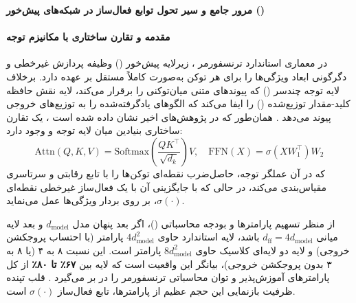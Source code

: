 \item \textbf{مرور جامع و سیر تحول توابع فعال‌ساز در شبکه‌های پیش‌خور ()}

\paragraph*{مقدمه و تقارن ساختاری  با مکانیزم توجه}
در معماری استاندارد ترنسفورمر \cite{vaswani2017attention}، زیرلایه پیش‌خور () وظیفه پردازش غیرخطی و دگرگونی ابعاد ویژگی‌ها را برای هر توکن به‌صورت کاملاً مستقل بر عهده دارد. برخلاف لایه توجه چندسر () که پیوندهای متنی میان‌توکنی را برقرار می‌کند، لایه  نقش حافظه کلید-مقدار توزیع‌شده () را ایفا می‌کند که الگوهای یادگرفته‌شده را به توزیع‌های خروجی پیوند می‌دهد \cite{geva2020transformer}. همان‌طور که در پژوهش‌های اخیر نشان داده شده است \cite{gerber2025attention, zhang2025flashmhf}، یک تقارن ساختاری بنیادین میان لایه توجه و  وجود دارد:
\begin{equation}
    \text{Attn}(Q, K, V) = \text{Softmax}\left(\frac{QK^\top}{\sqrt{d_k}}\right)V, \quad \text{FFN}(X) = \sigma(X W_1^\top) W_2
\end{equation}
که در آن عملگر توجه، حاصل‌ضرب نقطه‌ای توکن‌ها را با تابع رقابتی و سرتاسری  مقیاس‌بندی می‌کند، در حالی که  با جایگزینی آن با یک فعال‌ساز غیرخطی نقطه‌ای $\sigma(\cdot)$، بر روی بردار ویژگی‌ها عمل می‌نماید. 

از منظر تسهیم پارامترها و بودجه محاسباتی ()، اگر بعد پنهان مدل $d_{\text{model}}$ و بعد لایه میانی $d_{\text{ff}} = 4d_{\text{model}}$ باشد، لایه  استاندارد حاوی $4d_{\text{model}}^2$ پارامتر (با احتساب پروجکشن خروجی) و لایه  دو لایه‌ای کلاسیک حاوی $8d_{\text{model}}^2$ پارامتر است. این نسبت ۸ به ۴ (یا ۸ به ۳ بدون پروجکشن خروجی)، بیانگر این واقعیت است که لایه  بین \textbf{۶۷٪ تا ۸۰٪} از کل پارامترهای آموزش‌پذیر و توان محاسباتی ترنسفورمر را در بر می‌گیرد \cite{gerber2025attention, hu2025tardis, madhyastha2026sparsity}. قلب تپنده ظرفیت بازنمایی این حجم عظیم از پارامترها، تابع فعال‌ساز $\sigma(\cdot)$ است.


